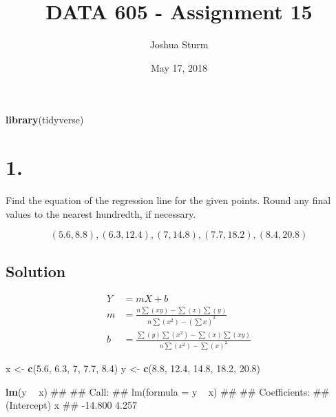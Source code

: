 \documentclass[]{article}
\title{DATA 605 - Assignment 15}
\author{Joshua Sturm}
\date{May 17, 2018}
\newenvironment{Shaded}{\begin{snugshade}}{\end{snugshade}}
\newcommand{\DecValTok}[1]{\textcolor[rgb]{0.00,0.00,0.81}{#1}}
\newcommand{\FloatTok}[1]{\textcolor[rgb]{0.00,0.00,0.81}{#1}}
\newcommand{\KeywordTok}[1]{\textcolor[rgb]{0.13,0.29,0.53}{\textbf{#1}}}
\newcommand{\NormalTok}[1]{#1}
\newcommand{\OperatorTok}[1]{\textcolor[rgb]{0.81,0.36,0.00}{\textbf{#1}}}
\newcommand{\StringTok}[1]{\textcolor[rgb]{0.31,0.60,0.02}{#1}}
\begin{document}
\maketitle

\begin{Shaded}
\begin{Highlighting}[]
\KeywordTok{library}\NormalTok{(tidyverse)}
\end{Highlighting}
\end{Shaded}

\hypertarget{section}{%
\section{1.}\label{section}}

Find the equation of the regression line for the given points. Round any
final values to the nearest hundredth, if necessary.

\[
( 5.6, 8.8 ), ( 6.3, 12.4 ), ( 7, 14.8 ), ( 7.7, 18.2 ), ( 8.4, 20.8 )
\]

\hypertarget{solution}{%
\subsection{Solution}\label{solution}}

\begin{align*}
Y &= mX + b \\
m &= \frac{n\sum(xy) - \sum(x)\sum(y)}{n\sum(x^2) - (\sum x)^2} \\
b &= \frac{\sum(y)\sum(x^2) - \sum(x)\sum(xy)}{n\sum(x^2) - \sum(x)^2}
\end{align*}

\begin{Shaded}
\begin{Highlighting}[]
\NormalTok{x <-}\StringTok{ }\KeywordTok{c}\NormalTok{(}\FloatTok{5.6}\NormalTok{, }\FloatTok{6.3}\NormalTok{, }\DecValTok{7}\NormalTok{, }\FloatTok{7.7}\NormalTok{, }\FloatTok{8.4}\NormalTok{)}
\NormalTok{y <-}\StringTok{ }\KeywordTok{c}\NormalTok{(}\FloatTok{8.8}\NormalTok{, }\FloatTok{12.4}\NormalTok{, }\FloatTok{14.8}\NormalTok{, }\FloatTok{18.2}\NormalTok{, }\FloatTok{20.8}\NormalTok{)}

\KeywordTok{lm}\NormalTok{(y }\OperatorTok{~}\StringTok{ }\NormalTok{x)}
\NormalTok{## }
\NormalTok{## Call:}
\NormalTok{## lm(formula = y ~ x)}
\NormalTok{## }
\NormalTok{## Coefficients:}
\NormalTok{## (Intercept)            x  }
\NormalTok{##     -14.800        4.257}
\end{Highlighting}
\end{Shaded}
\end{document}

